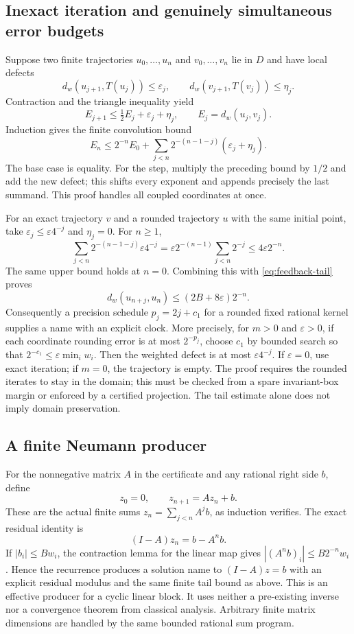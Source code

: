 \subsection{Inexact iteration and genuinely simultaneous error budgets}

Suppose two finite trajectories $u_0,\ldots,u_n$ and
$v_0,\ldots,v_n$ lie in $D$ and have local defects
\[
 d_w(u_{j+1},T(u_j))\leq\varepsilon_j,
 \qquad d_w(v_{j+1},T(v_j))\leq\eta_j.
\]
Contraction and the triangle inequality yield
\[
 E_{j+1}\leq\tfrac12E_j+\varepsilon_j+\eta_j,
 \qquad E_j=d_w(u_j,v_j).
\]
Induction gives the finite convolution bound
\begin{equation}\label{eq:feedback-inexact}
 E_n\leq 2^{-n}E_0+
 \sum_{j<n}2^{-(n-1-j)}(\varepsilon_j+\eta_j).
\end{equation}
The base case is equality. For the step, multiply the preceding bound by
$1/2$ and add the new defect; this shifts every exponent and appends precisely
the last summand. This proof handles all coupled coordinates at once.

For an exact trajectory $v$ and a rounded trajectory $u$ with the same initial
point, take $\varepsilon_j\leq\varepsilon4^{-j}$ and $\eta_j=0$.
For $n\geq1$,
\[
 \sum_{j<n}2^{-(n-1-j)}\varepsilon4^{-j}
 =\varepsilon2^{-(n-1)}\sum_{j<n}2^{-j}
 \leq4\varepsilon2^{-n}.
\]
The same upper bound holds at $n=0$. Combining this with
\eqref{eq:feedback-tail} proves
\[
 d_w(u_{n+j},u_n)\leq(2B+8\varepsilon)2^{-n}.
\]
Consequently a precision schedule $p_j=2j+c_1$ for a rounded fixed rational
kernel supplies a name with an explicit clock. More precisely, for $m>0$ and $\varepsilon>0$, if each coordinate rounding error is at most $2^{-p_j}$, choose $c_1$ by bounded search so that $2^{-c_1}\le\varepsilon\min_i w_i$. Then the weighted defect is at most $\varepsilon4^{-j}$. If $\varepsilon=0$, use exact iteration; if $m=0$, the trajectory is empty. The proof requires the rounded
iterates to stay in the domain; this must be checked from a spare invariant-box
margin or enforced by a certified projection. The tail estimate alone does
not imply domain preservation.

\subsection{A finite Neumann producer}

For the nonnegative matrix $A$ in the certificate and any rational right side
$b$, define
\[
 z_0=0,\qquad z_{n+1}=Az_n+b.
\]
These are the actual finite sums
$z_n=\sum_{j<n}A^j b$, as induction verifies. The exact residual identity is
\[
 (I-A)z_n=b-A^n b.
\]
If $|b_i|\leq Bw_i$, the contraction lemma for the linear map gives
$|(A^n b)_i|\leq B2^{-n}w_i$. Hence the recurrence produces a solution name
to $(I-A)z=b$ with an explicit residual modulus and the same finite tail
bound as above. This is an effective producer for a cyclic linear block.
It uses neither a pre-existing inverse nor a convergence theorem from
classical analysis. Arbitrary finite matrix dimensions are handled by the
same bounded rational sum program.

